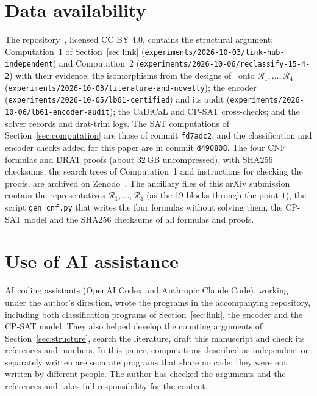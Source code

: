 \documentclass[11pt]{amsart}
\theoremstyle{definition}
\theoremstyle{remark}
\newcommand{\cR}{\mathcal{R}}
\begin{document}
\section{Data availability}\label{sec:data}

The repository~\cite{covering64repo}, licensed CC BY 4.0, contains the
structural argument; Computation~1 of Section~\ref{sec:link}
(\nolinkurl{experiments/2026-10-03/link-hub-independent}) and Computation~2
(\nolinkurl{experiments/2026-10-06/reclassify-15-4-2}) with their evidence; the
isomorphisms from the designs of~\cite{allston1988} onto
$\cR_1,\dots,\cR_4$ (\nolinkurl{experiments/2026-10-03/literature-and-novelty});
the encoder (\nolinkurl{experiments/2026-10-05/lb61-certified}) and its audit
(\nolinkurl{experiments/2026-10-06/lb61-encoder-audit}); the CaDiCaL and CP-SAT
cross-checks; and the solver records and drat-trim logs. The SAT
computations of Section~\ref{sec:computation} are those of commit
\texttt{fd7adc2}, and the classification and encoder checks added for this
paper are in commit \texttt{d490808}. The four CNF formulas and DRAT
proofs (about $32$\,GB uncompressed), with SHA256 checksums, the search trees
of Computation~1 and instructions for checking the proofs, are archived on
Zenodo~\cite{zenodo}. The ancillary files of this arXiv submission contain
the representatives $\cR_1,\dots,\cR_4$ (as the 19 blocks through the point
$1$), the script \texttt{gen\_cnf.py} that writes the four formulas without
solving them, the CP-SAT model and the SHA256 checksums of all formulas and
proofs.

\section*{Use of AI assistance}

AI coding assistants (OpenAI Codex and Anthropic Claude Code), working under
the author's direction, wrote the programs in the accompanying repository,
including both classification programs of Section~\ref{sec:link}, the
encoder and the CP-SAT model. They also helped develop the counting arguments
of Section~\ref{sec:structure}, search the literature, draft this manuscript
and check its references and numbers. In this paper, computations described
as independent or separately written are separate programs that share no
code; they were not written by different people. The author has checked the
arguments and the references and takes full responsibility for the content.



\end{document}
